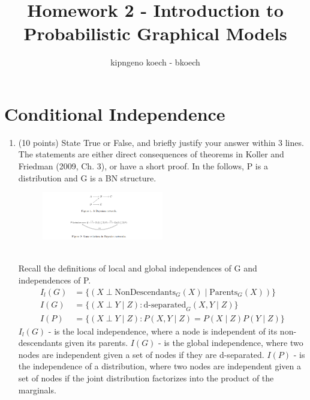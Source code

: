 \documentclass[a3paper,12pt]{extarticle} %
\begin{document}
\author{kipngeno koech - bkoech}
\title{Homework 2 - Introduction to Probabilistic Graphical Models}   
\maketitle

\medskip
\maketitle
\section{Conditional Independence}
\begin{enumerate}
    \item (10 points) State True or False, and briefly justify your answer within 3 lines. The statements are either
    direct consequences of theorems in Koller and Friedman (2009, Ch. 3), or have a short proof. In the
    follows, P is a distribution and G is a BN structure.
    \begin{figure}[h!]
        \centering
        \includegraphics[width=0.5\textwidth]{"conditional_independence.png"}
        \label{fig:example_image}
    \end{figure}
    \\ Recall the definitions of local and global independences of G and independences of P.
    \begin{align}
        I_l(G) &= \{(X \perp \text{NonDescendants}_G(X) \mid \text{Parents}_G(X))\} \\
        I(G) &= \{(X \perp Y \mid Z) : \text{d-separated}_G(X, Y \mid Z)\} \\
        I(P) &= \{(X \perp Y \mid Z) : P(X, Y \mid Z) = P(X \mid Z)P(Y \mid Z)\}
    \end{align}
    \(I_l(G)\) - is the local independence, where a node is independent of its non-descendants given its parents. \(I(G)\) - is the global independence, where two nodes are independent given a set of nodes if they are d-separated. \(I(P)\) - is the independence of a distribution, where two nodes are independent given a set of nodes if the joint distribution factorizes into the product of the marginals.

\end{enumerate}
\end{document}
